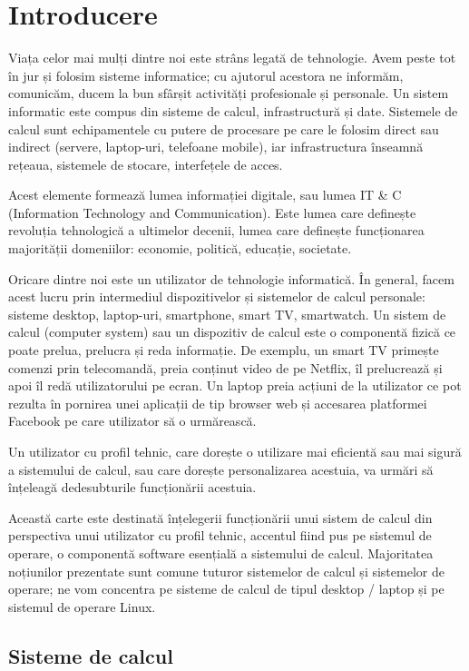 \chapter{Introducere}
\label{chapter:intro}

Viața celor mai mulți dintre noi este strâns legată de tehnologie. Avem peste tot în jur și folosim sisteme informatice; cu ajutorul acestora ne informăm, comunicăm, ducem la bun sfârșit activități profesionale și personale. Un sistem informatic este compus din sisteme de calcul, infrastructură și date. Sistemele de calcul sunt echipamentele cu putere de procesare pe care le folosim direct sau indirect (servere, laptop-uri, telefoane mobile), iar infrastructura înseamnă rețeaua, sistemele de stocare, interfețele de acces.

Acest elemente formează lumea informației digitale, sau lumea IT \& C (Information Technology and Communication). Este lumea care definește revoluția tehnologică a ultimelor decenii, lumea care definește funcționarea majorității domeniilor: economie, politică, educație, societate.

Oricare dintre noi este un utilizator de tehnologie informatică. În general, facem acest lucru prin intermediul dispozitivelor și sistemelor de calcul personale: sisteme desktop, laptop-uri, smartphone, smart TV, smartwatch. Un sistem de calcul (computer system) sau un dispozitiv de calcul este o componentă fizică ce poate prelua, prelucra și reda informație. De exemplu, un smart TV primește comenzi prin telecomandă, preia conținut video de pe Netflix, îl prelucrează și apoi îl redă utilizatorului pe ecran. Un laptop preia acțiuni de la utilizator ce pot rezulta în pornirea unei aplicații de tip browser web și accesarea platformei Facebook pe care utilizator să o urmărească.

Un utilizator cu profil tehnic, care dorește o utilizare mai eficientă sau mai sigură a sistemului de calcul, sau care dorește personalizarea acestuia, va urmări să înțeleagă dedesubturile funcționării acestuia.

Această carte este destinată înțelegerii funcționării unui sistem de calcul din perspectiva unui utilizator cu profil tehnic, accentul fiind pus pe sistemul de operare, o componentă software esențială a sistemului de calcul. Majoritatea noțiunilor prezentate sunt comune tuturor sistemelor de calcul și sistemelor de operare; ne vom concentra pe sisteme de calcul de tipul desktop / laptop și pe sistemul de operare Linux.

\section{Sisteme de calcul}
\label{sec:intro:computing-systems}

